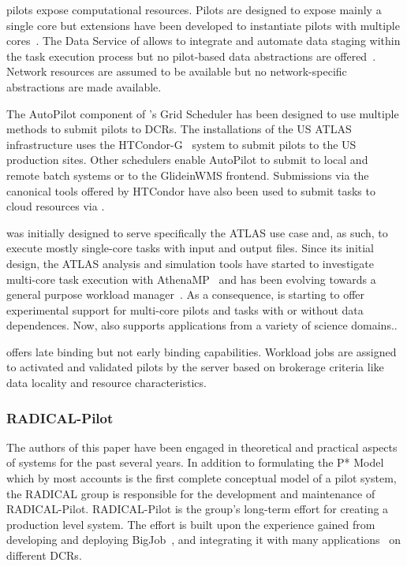 \documentclass{sig-alternate}
\begin{document}

\panda pilots expose computational resources. Pilots are designed to expose
mainly a single core but extensions have been developed to instantiate pilots
with multiple cores~\cite{crooks2012multi}. The Data Service of \panda allows to
integrate and automate data staging within the task execution process but no
pilot-based data abstractions are offered~\cite{maeno2012pd2p}. Network
resources are assumed to be available but no network-specific abstractions are
made available.

The AutoPilot component of \panda's Grid Scheduler has been designed to use
multiple methods to submit pilots to DCRs. The \panda installations of the US
ATLAS infrastructure uses the HTCondor-G~\cite{frey2002condorG} system to submit
pilots to the US production sites. Other schedulers enable AutoPilot to submit
to local and remote batch systems or to the GlideinWMS frontend. Submissions via
the canonical tools offered by HTCondor have also been used to submit tasks to
cloud resources via
\panda.

\panda was initially designed to serve specifically the ATLAS use case and, as
such, to execute mostly single-core tasks with input and output files. Since its
initial design, the ATLAS analysis and simulation tools have started to
investigate multi-core task execution with AthenaMP~\cite{crooks2012multi} and
\panda has been evolving towards a general purpose workload
manager~\cite{schovancova2014next,schovancova2013panda,borodin2015scaling}. As a
consequence, \panda is starting to offer experimental support for multi-core
pilots and tasks with or without data dependences. Now, \panda also supports
applications from a variety of science domains.\cite{maeno2014evolution}.

\panda offers late binding but not early binding capabilities. Workload jobs are
assigned to activated and validated pilots by the \panda server based on
brokerage criteria like data locality and resource characteristics.

%
\subsubsection{RADICAL-Pilot}
\label{sec:radical_pilot}

The authors of this paper have been engaged in theoretical and practical aspects
of \pilot systems for the past several years. In addition to formulating the P*
Model~\cite{luckow2012} which by most accounts is the first complete conceptual
model of a pilot system, the RADICAL group is responsible for the development
and maintenance of RADICAL-Pilot\cite{merzky2015radical,rp_url}. RADICAL-Pilot
is the group's long-term effort for creating a production level \pilot system.
The effort is built upon the experience gained from developing and deploying
BigJob~\cite{luckow2010}, and integrating it with many
applications~\cite{ko2010efficient,kim2010exploring,ct500776j} on different DCRs.
\end{document}
